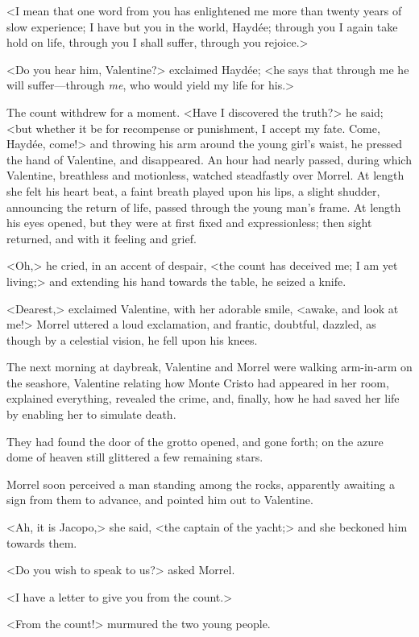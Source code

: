  <I mean that one word from you has enlightened me more than twenty years of slow experience; I have but you in the world, Haydée; through you I again take hold on life, through you I shall suffer, through you rejoice.> 

 <Do you hear him, Valentine?> exclaimed Haydée; <he says that through me he will suffer—through \textit{me}, who would yield my life for his.> 

 The count withdrew for a moment. <Have I discovered the truth?> he said; <but whether it be for recompense or punishment, I accept my fate. Come, Haydée, come!> and throwing his arm around the young girl's waist, he pressed the hand of Valentine, and disappeared.  An hour had nearly passed, during which Valentine, breathless and motionless, watched steadfastly over Morrel. At length she felt his heart beat, a faint breath played upon his lips, a slight shudder, announcing the return of life, passed through the young man's frame. At length his eyes opened, but they were at first fixed and expressionless; then sight returned, and with it feeling and grief. 

 <Oh,> he cried, in an accent of despair, <the count has deceived me; I am yet living;> and extending his hand towards the table, he seized a knife. 

 <Dearest,> exclaimed Valentine, with her adorable smile, <awake, and look at me!> Morrel uttered a loud exclamation, and frantic, doubtful, dazzled, as though by a celestial vision, he fell upon his knees. 

 The next morning at daybreak, Valentine and Morrel were walking arm-in-arm on the seashore, Valentine relating how Monte Cristo had appeared in her room, explained everything, revealed the crime, and, finally, how he had saved her life by enabling her to simulate death. 

 They had found the door of the grotto opened, and gone forth; on the azure dome of heaven still glittered a few remaining stars. 

 Morrel soon perceived a man standing among the rocks, apparently awaiting a sign from them to advance, and pointed him out to Valentine. 

 <Ah, it is Jacopo,> she said, <the captain of the yacht;> and she beckoned him towards them. 

 <Do you wish to speak to us?> asked Morrel. 

 <I have a letter to give you from the count.> 

 <From the count!> murmured the two young people. 


